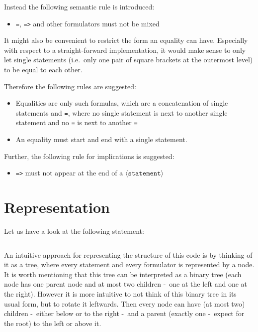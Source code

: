 \documentclass[british]{article}
\newenvironment{code}{\captionsetup{type=listing}}{}
\newcommand\prv{bc}
\newcommand\m[1]{\texttt{#1}}
\begin{document}
Instead the following semantic rule is introduced:
\begin{itemize}
\item \m{=}, \m{=>} and other formulators must not be mixed \checkmark\
\end{itemize}

\medskip{}

It might also be convenient to restrict the form an equality can have.
Especially with respect to a straight-forward implementation, it would
make sense to only let single statements (i.e.\ only one pair of square
brackets at the outermost level) to be equal to each other.\newline

Therefore the following rules are suggested:
\begin{itemize}
	\item
		Equalities are only such formulas, which are a concatenation of single
		statements and \m{=}, where no single statement is next to another
		single statement and no \m{=} is next to another \m{=} \checkmark\
	\item
		An equality must start and end with a single statement. \checkmark\
\end{itemize}
\medskip{}

Further, the following rule for implications is suggested:

\begin{itemize}
\item \m{=>} must not appear at the end of a $\langle\texttt{statement}\rangle$
\end{itemize}
\pagebreak{}

\section{Representation}

Let us have a look at the following statement:

\begin{code}
\label{code:ex1}
\inputminted[linenos]{\prv}{examples/exmp1.prove}
\end{code}

An intuitive approach for representing the structure of this code is by thinking
of it as a tree, where every statement and every formulator is represented by a
node. It is worth mentioning that this tree can be interpreted as a binary tree
(each node has one parent node and at most two children -\ one at the left and
one at the right). However it is more intuitive to not think of this binary tree
in its usual form, but to rotate it leftwards. Then every node can have (at most
two) children -\ either below or to the right -\ and a parent (exactly one -\
expect for the root) to the left or above it.
\end{document}
